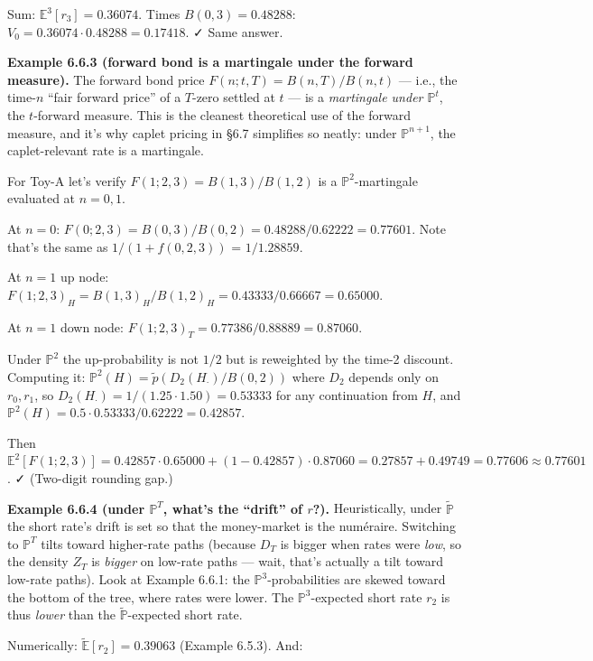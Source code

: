 \documentclass[
  10pt,
  twoside]{book}
\begin{document}
Sum: \(\mathbb E^3[r_3] = 0.36074\). Times \(B(0, 3) = 0.48288\):
\(V_0 = 0.36074 \cdot 0.48288 = 0.17418\). ✓ Same answer.

\textbf{Example 6.6.3 (forward bond is a martingale under the forward
measure).} The forward bond price \(F(n; t, T) = B(n, T) / B(n, t)\) ---
i.e., the time-\(n\) ``fair forward price'' of a \(T\)-zero settled at
\(t\) --- is a \emph{martingale under \(\mathbb P^t\)}, the
\(t\)-forward measure. This is the cleanest theoretical use of the
forward measure, and it's why caplet pricing in §6.7 simplifies so
neatly: under \(\mathbb P^{n+1}\), the caplet-relevant rate is a
martingale.

For Toy-A let's verify \(F(1; 2, 3) = B(1, 3)/B(1, 2)\) is a
\(\mathbb P^2\)-martingale evaluated at \(n = 0, 1\).

At \(n = 0\):
\(F(0; 2, 3) = B(0, 3)/B(0, 2) = 0.48288/0.62222 = 0.77601\). Note
that's the same as \(1/(1 + f(0, 2, 3))\) = \(1/1.28859\).

At \(n = 1\) up node:
\(F(1; 2, 3)_H = B(1, 3)_H / B(1, 2)_H = 0.43333/0.66667 = 0.65000\).

At \(n = 1\) down node: \(F(1; 2, 3)_T = 0.77386/0.88889 = 0.87060\).

Under \(\mathbb P^2\) the up-probability is not \(1/2\) but is
reweighted by the time-2 discount. Computing it:
\(\mathbb P^2(H) = \tilde p (D_2(H_\cdot)/B(0, 2))\) where \(D_2\)
depends only on \(r_0, r_1\), so
\(D_2(H_\cdot) = 1/(1.25 \cdot 1.50) = 0.53333\) for any continuation
from \(H\), and
\(\mathbb P^2(H) = 0.5 \cdot 0.53333/0.62222 = 0.42857\).

Then
\(\mathbb E^2[F(1; 2, 3)] = 0.42857 \cdot 0.65000 + (1 - 0.42857) \cdot 0.87060 = 0.27857 + 0.49749 = 0.77606 \approx 0.77601\).
✓ (Two-digit rounding gap.)

\textbf{Example 6.6.4 (under \(\mathbb P^T\), what's the ``drift'' of
\(r\)?).} Heuristically, under \(\tilde{\mathbb P}\) the short rate's
drift is set so that the money-market is the numéraire. Switching to
\(\mathbb P^T\) tilts toward higher-rate paths (because \(D_T\) is
bigger when rates were \emph{low}, so the density \(Z_T\) is
\emph{bigger} on low-rate paths --- wait, that's actually a tilt toward
low-rate paths). Look at Example 6.6.1: the
\(\mathbb P^3\)-probabilities are skewed toward the bottom of the tree,
where rates were lower. The \(\mathbb P^3\)-expected short rate \(r_2\)
is thus \emph{lower} than the \(\tilde{\mathbb P}\)-expected short rate.

Numerically: \(\tilde{\mathbb E}[r_2] = 0.39063\) (Example 6.5.3). And:
\end{document}
